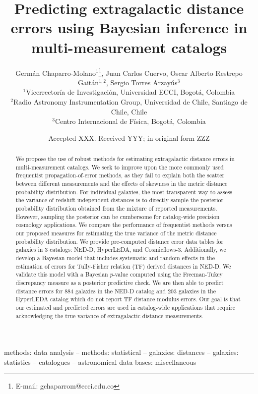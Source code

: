 \documentclass[a4paper,fleqn,usenatbib]{mnras}
\title[Predicting extragalactic distance errors]{Predicting extragalactic distance errors using Bayesian inference in multi-measurement catalogs}
\author[G. Chaparro-Molano et al.]{Germ\'an Chaparro-Molano$^{1}$\thanks{E-mail: gchaparrom@ecci.edu.co},
Juan Carlos Cuervo,
Oscar Alberto Restrepo Gait\'an$^{1,2}$, \newauthor
Sergio Torres Arzay\'{u}s$^{3}$
\\
$^{1}$Vicerrector\'ia de Investigaci\'on, Universidad ECCI, Bogot\'a, Colombia\\
$^{2}$Radio Astronomy Instrumentation Group, Universidad de Chile, Santiago de Chile, Chile\\
$^{3}$Centro Internacional de F\'isica, Bogot\'a, Colombia
}
\date{Accepted XXX. Received YYY; in original form ZZZ}
\begin{document}
\label{firstpage}
\pagerange{\pageref{firstpage}--\pageref{lastpage}}
\maketitle

\begin{abstract}
We propose the use of robust methods for estimating extragalactic distance errors in multi-measurement catalogs. We seek to improve upon the more commonly used frequentist propagation-of-error methods, as they fail to explain both the scatter between different measurements and the effects of skewness in the metric distance probability distribution. For individual galaxies, the most transparent way to assess the variance of redshift independent distances is to directly sample the posterior probability distribution obtained from the mixture of reported measurements. However, sampling the posterior can be cumbersome for catalog-wide precision cosmology applications. We compare the performance of frequentist methods versus our proposed measures for estimating the true variance of the metric distance probability distribution. We provide pre-computed distance error data tables for galaxies in 3 catalogs: NED-D, HyperLEDA, and Cosmicflows-3. Additionally, we develop a Bayesian model that includes systematic and random effects in the estimation of errors for Tully-Fisher relation (TF) derived distances in NED-D. We validate this model with a Bayesian $p$-value computed using the Freeman-Tukey discrepancy measure as a posterior predictive check. We are then able to predict distance errors for 884 galaxies in the NED-D catalog and 203 galaxies in the HyperLEDA catalog which do not report TF distance modulus errors. Our goal is that our estimated and predicted errors are used in catalog-wide applications that require acknowledging the true variance of extragalactic distance measurements.
\end{abstract}

\begin{keywords}
methods: data analysis -- methods: statistical -- galaxies: distances -- galaxies: statistics -- catalogues -- astronomical data bases: miscellaneous
\end{keywords}


\end{document}
